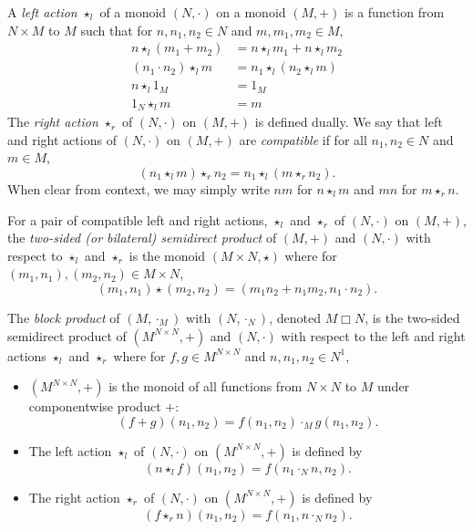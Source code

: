 \documentclass[a4paper,UKenglish,cleveref, autoref, thm-restate, anonymous]{lipics-v2021}
\begin{document}
\begin{definition}
    A \emph{left action} $\star_l$ of a monoid $(N, \cdot)$ on a monoid $(M, +)$ is a function from $N \times M$ to $M$ such that for $n,n_1,n_2 \in N$ and $m,m_1,m_2 \in M$, \begin{align*}
        n \star_l (m_1 + m_2) &= n \star_l m_1 + n \star_l m_2\\
        (n_1 \cdot n_2) \star_l m &= n_1 \star_l (n_2 \star_l m)\\
        n \star_l 1_M &= 1_M\\
        1_N \star_l m &= m
    \end{align*}
    The \emph{right action} $\star_r$ of $(N, \cdot)$ on $(M, +)$ is defined dually. We say that left and right actions of $(N, \cdot)$ on $(M,+)$ are \emph{compatible} if for all $n_1,n_2 \in N$ and $m \in M$, \[
        (n_1 \star_l m) \star_r n_2 = n_1 \star_l (m \star_r n_2).
    \] When clear from context, we may simply write $nm$ for $n \star_l m$ and $mn$ for $m \star_r n$.
\end{definition}

\begin{definition}
    For a pair of compatible left and right actions, $\star_l$ and $\star_r$ of $(N, \cdot)$ on $(M, +)$, the \emph{two-sided (or bilateral) semidirect product} of $(M, +)$ and $(N, \cdot)$ with respect to $\star_l$ and $\star_r$ is the monoid $(M \times N, \star)$ where for $(m_1,n_1),(m_2,n_2) \in M \times N$, \[
        (m_1,n_1) \star (m_2,n_2) = (m_1n_2 + n_1m_2, n_1 \cdot n_2).
    \]
\end{definition}

\begin{definition}
    The \emph{block product} of $(M, \cdot_M)$ with $(N, \cdot_N)$, denoted $M \Box N$, is the two-sided semidirect product of $(M^{N \times N}, +)$ and $(N, \cdot)$ with respect to the left and right actions $\star_l$ and $\star_r$ where for $f,g \in M^{N \times N}$ and $n,n_1,n_2 \in N^1$,
    \begin{itemize}
        \item $(M^{N \times N}, +)$ is the monoid of all functions from $N \times N$ to $M$ under componentwise product $+$: \[
            (f + g)(n_1,n_2) = f(n_1,n_2) \cdot_M g(n_1,n_2).
        \]
        \item The left action $\star_l$ of $(N, \cdot)$ on $(M^{N \times N}, +)$ is defined by \[
            (n \star_l f)(n_1, n_2) = f(n_1 \cdot_N n, n_2).
        \]
        \item The right action $\star_r$ of $(N, \cdot)$ on $(M^{N \times N}, +)$ is defined by \[
            (f \star_r n)(n_1, n_2) = f(n_1, n \cdot_N n_2).
        \]
    \end{itemize}
\end{definition}
\end{document}
